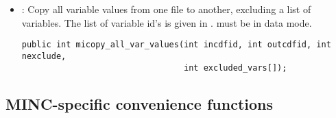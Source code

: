 \documentclass{article}
\begin{document}
\begin{itemize}
\item {} : Copy all variable values from one
file to another, excluding a list of variables.  The list of
 variable id's is given in .
 must be in data mode.
\begin{verbatim}
public int micopy_all_var_values(int incdfid, int outcdfid, int nexclude,
                                 int excluded_vars[]);
\end{verbatim}

\end{itemize}

\subsection{MINC-specific convenience functions}
\end{document}
